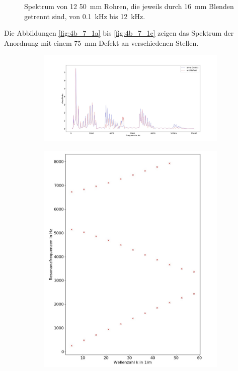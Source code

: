 \begin{figure}
\begin{subfigure}{0.34\textwidth}
\end{subfigure}
\caption{Spektrum von 12 50~mm Rohren, die jeweils durch 16~mm Blenden getrennt sind, von 0.1~kHz bis 12~kHz.}
\label{fig:4b_7}
\end{figure}
Die Abbildungen \ref{fig:4b_7_1a} bis \ref{fig:4b_7_1c} zeigen das Spektrum der Anordnung mit einem 75~mm Defekt an verschiedenen Stellen.
\begin{figure}
\centering
\begin{subfigure}{0.65\textwidth}
\includegraphics[width=\textwidth]{content/Scripts/defect1.jpg}
\end{subfigure}
\begin{subfigure}{0.34\textwidth}
\includegraphics[width=\textwidth]{content/Scripts/4b_7_1a.jpg}

\end{subfigure}
\end{figure}
